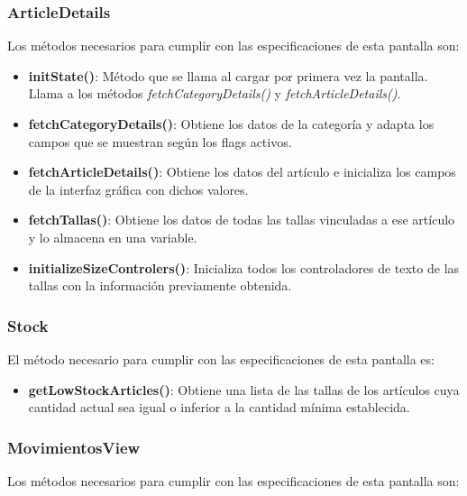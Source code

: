 \subsubsection{ArticleDetails}

Los métodos necesarios para cumplir con las especificaciones de esta pantalla son:

\begin{itemize}
	\item \textbf{initState()}:  Método que se llama al cargar por primera vez la pantalla. Llama a los métodos \textit{fetchCategoryDetails()} y \textit{fetchArticleDetails()}. 
	\item \textbf{fetchCategoryDetails()}: Obtiene los datos de la categoría y adapta los campos que se muestran según los flags activos. 
	\item \textbf{fetchArticleDetails()}: Obtiene los datos del artículo e inicializa los campos de la interfaz gráfica con dichos valores. 
	\item \textbf{fetchTallas()}: Obtiene los datos de todas las tallas vinculadas a ese artículo y lo almacena en una variable.
	\item \textbf{initializeSizeControlers()}: Inicializa todos los controladores de texto de las tallas con la información previamente obtenida. 
\end{itemize}

\subsubsection{Stock}

El método necesario para cumplir con las especificaciones de esta pantalla es:

\begin{itemize}
	\item \textbf{getLowStockArticles()}: Obtiene una lista de las tallas de los artículos cuya cantidad actual sea igual o inferior a la cantidad mínima establecida. 
\end{itemize}

\subsubsection{MovimientosView}

Los métodos necesarios para cumplir con las especificaciones de esta pantalla son: 

